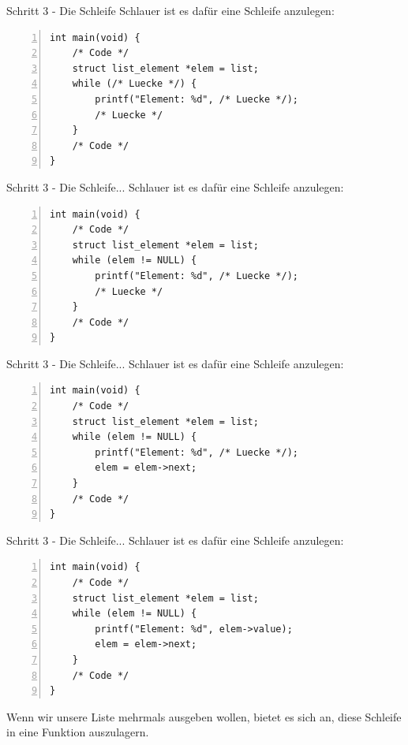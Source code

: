 \begin{frame}[fragile]{Schritt 3 - Die Schleife}
Schlauer ist es dafür eine Schleife anzulegen: \\
\begin{lstlisting}[numbers=left]
int main(void) {
    /* Code */
    struct list_element *elem = list;
    while (/* Luecke */) {
        printf("Element: %d", /* Luecke */);
        /* Luecke */
    }
    /* Code */
}\end{lstlisting}
\end{frame}


\begin{frame}[fragile]{Schritt 3 - Die Schleife...}
Schlauer ist es dafür eine Schleife anzulegen: \\
\begin{lstlisting}[numbers=left]
int main(void) {
    /* Code */
    struct list_element *elem = list;
    while (elem != NULL) {
        printf("Element: %d", /* Luecke */);
        /* Luecke */
    }
    /* Code */
}\end{lstlisting}
\end{frame}


\begin{frame}[fragile]{Schritt 3 - Die Schleife...}
Schlauer ist es dafür eine Schleife anzulegen: \\
\begin{lstlisting}[numbers=left]
int main(void) {
    /* Code */
    struct list_element *elem = list;
    while (elem != NULL) {
        printf("Element: %d", /* Luecke */);
        elem = elem->next;
    }
    /* Code */
}\end{lstlisting}
\end{frame}


\begin{frame}[fragile]{Schritt 3 - Die Schleife...}
Schlauer ist es dafür eine Schleife anzulegen: \\
\begin{lstlisting}[numbers=left]
int main(void) {
    /* Code */
    struct list_element *elem = list;
    while (elem != NULL) {
        printf("Element: %d", elem->value);
        elem = elem->next;
    }
    /* Code */
}\end{lstlisting}

Wenn wir unsere Liste mehrmals ausgeben wollen, bietet es sich an, diese Schleife in eine Funktion auszulagern.
\end{frame}

